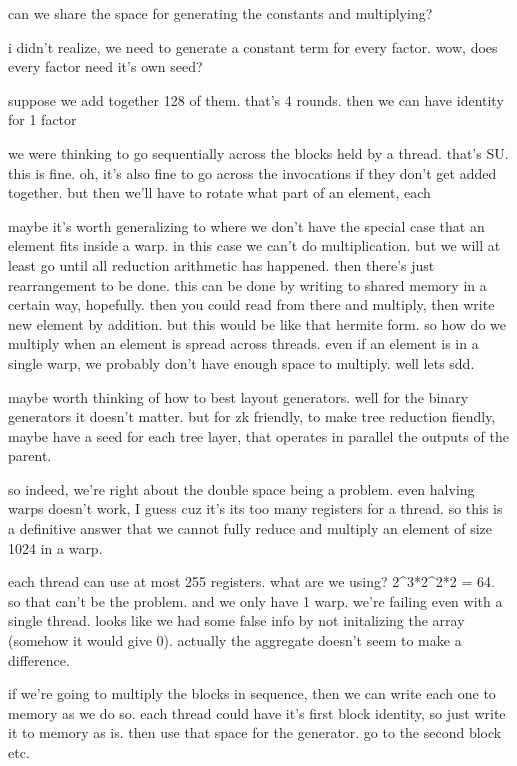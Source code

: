 can we share the space for generating the constants and multiplying?

i didn't realize, we need to generate a constant term for every factor.
wow, does every factor need it's own seed? 

suppose we add together 128 of them. that's 4 rounds.
then we can have identity for 1 factor 

we were thinking to go sequentially across the blocks held by a thread. that's SU. this is fine. 
oh, it's also fine to go across the invocations if they don't get added together. 
but then we'll have to rotate what part of an element, each 

maybe it's worth generalizing to where we don't have the special case that an element fits inside a warp. in this case we can't do multiplication. but we will at least go until all reduction arithmetic has happened. then there's just rearrangement to be done. this can be done by writing to shared memory in a certain way, hopefully.
then you could read from there and multiply, then write new element by addition. 
but this would be like that hermite form.
so how do we multiply when an element is spread across threads. 
even if an element is in a single warp, we probably don't have enough space to multiply. well lets sdd. 



maybe worth thinking of how to best layout generators. well for the binary generators it doesn't matter.
but for zk friendly, to make tree reduction fiendly, maybe have a seed for each tree layer, that operates in parallel the outputs of the parent. 


so indeed, we're right about the double space being a problem. even halving warps doesn't work, I guess cuz it's its too many registers for a thread.
so this is a definitive answer that we cannot fully reduce and multiply an element of size 1024 in a warp. 

each thread can use at most 255 registers. what are we using? 2^3*2^2*2 = 64. so that can't be the problem. and we only have 1 warp. we're failing even with a single thread. 
looks like we had some false info by not initalizing the array (somehow it would give 0).
actually the aggregate doesn't seem to make a difference. 

if we're going to multiply the blocks in sequence, then we can write each one to memory as we do so. each thread could have it's first block identity, so just write it to memory as is. then use that space for the generator. go to the second block etc.

